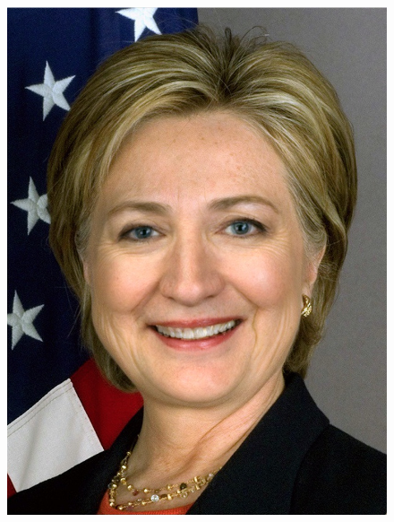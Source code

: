 \documentclass[a4paper]{article}
\begin{document}
\begin{figure}[htp]
{\begin{minipage}[b]{0.31\columnwidth}
{\includegraphics[width=1\columnwidth]{FHC.png}
}
\label{fig:3-5:d}
\end{minipage}
}
\hfil
{}
\end{figure}
\end{document}
